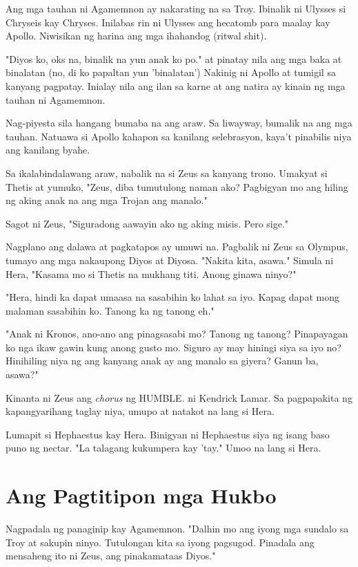 \documentclass[12pt,letterpaper]{report}
\begin{document}
Ang mga tauhan ni Agamemnon ay nakarating na sa Troy. Ibinalik ni Ulysses si Chryseis kay Chryses.
Inilabas rin ni Ulysses ang hecatomb para maalay kay Apollo. Niwisikan ng harina ang mga ihahandog (ritwal shit).

"Diyos ko, oks na, binalik na yun anak ko po." at pinatay nila ang mga baka at binalatan
(no, di ko papaltan yun 'binalatan') Nakinig ni Apollo at tumigil sa kanyang pagpatay.
Inialay nila ang ilan sa karne at ang natira ay kinain ng mga tauhan ni Agamemnon.

Nag-piyesta sila hangang bumaba na ang araw. Sa liwayway, bumalik na ang mga tauhan.
Natuawa si Apollo kahapon sa kanilang selebrasyon, kaya't pinabilis niya ang kanilang byahe.

Sa ikalabindalawang araw, nabalik na si Zeus sa kanyang trono. Umakyat si Thetis at yumuko,
"Zeus, diba tumutulong naman ako? Pagbigyan mo ang hiling ng aking anak na ang mga Trojan ang manalo."

Sagot ni Zeus, "Siguradong aawayin ako ng aking misis. Pero sige."

Nagplano ang dalawa at pagkatapos ay umuwi na. Pagbalik ni Zeus sa Olympus, tumayo ang mga nakaupong Diyos at Diyosa.
"Nakita kita, asawa." Simula ni Hera, "Kasama mo si Thetis na mukhang titi. Anong ginawa ninyo?"

"Hera, hindi ka dapat umaasa na sasabihin ko lahat sa iyo. Kapag dapat mong malaman sasabihin ko.
Tanong ka ng tanong eh."

"Anak ni Kronos, ano-ano ang pinagsasabi mo? Tanong ng tanong?
Pinapayagan ko nga ikaw gawin kung anong gusto mo. Siguro ay may hiningi siya sa iyo no?
Hinihiling niya ng ang kanyang anak ay ang manalo sa giyera? Ganun ba, asawa?"

Kinanta ni Zeus ang \textit{chorus} ng HUMBLE. ni Kendrick Lamar. Sa pagpapakita ng kapangyarihang taglay niya,
umupo at natakot na lang si Hera.

Lumapit si Hephaestus kay Hera. Binigyan ni Hephaestus siya ng isang baso puno ng nectar.
"La talagang kukumpera kay 'tay." Umoo na lang si Hera.

\pagebreak

\chapter{Ang Pagtitipon mga Hukbo}

Nagpadala ng panaginip kay Agamemnon. "Dalhin mo ang iyong mga sundalo sa Troy at sakupin ninyo.
Tutulongan kita sa iyong pagsugod. Pinadala ang mensaheng ito ni Zeus, ang pinakamataas Diyos."
\end{document}
